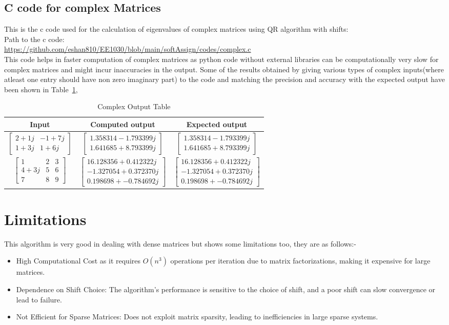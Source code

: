 \documentclass[12pt]{article}
\newcommand{\myvec}[1]{\begin{bmatrix} #1 \end{bmatrix}}
\begin{document}
\subsection{C code for complex Matrices}
This is the c code used for the calculation of eigenvalues of complex matrices using QR algorithm with shifts: \\
Path to the c code:\\
\url{https://github.com/eshan810/EE1030/blob/main/softAssign/codes/complex.c}\\
This code helps in faster computation of complex matrices as python code without external libraries can be computationally very slow for complex matrices and might incur inaccuracies in the output.
Some of the results obtained by giving various types of complex inputs(where atleast one entry should have non zero imaginary part) to the code and matching the precision and accuracy with the expected output have been shown in Table~\ref{Table 2},
\begin{table}[H]
\centering
\begin{tabular}{|c|c|c|}
\hline
\textbf{Input} & \textbf{Computed output} & \textbf{Expected output} \\
\hline
$\myvec{2 + 1j & -1 + 7j\\1 + 3j&1 + 6j}$ & $\myvec{1.358314 - 1.793399j\\ 1.641685 + 8.793399j}$ & $\myvec{1.358314 - 1.793399j\\ 1.641685 + 8.793399j}$ \\ \hline
$\myvec{1&2&3\\4 + 3j&5&6\\7&8&9}$ & $\myvec{16.128356 + 0.412322j\\ -1.327054 + 0.372370j\\ 0.198698 + -0.784692j}$ & $\myvec{16.128356 + 0.412322j\\ -1.327054 + 0.372370j\\ 0.198698 + -0.784692j}$ \\ \hline
\end{tabular}
\caption{Complex Output Table}
\label{Table 2}
\end{table}
\section{Limitations}
This algorithm is very good in dealing with dense  matrices but shows some limitations too, they are as follows:-
\begin{itemize}
    \item High Computational Cost as it requires $O(n^3)$ operations per iteration due to matrix factorizations, making it expensive for large matrices.
    \item Dependence on Shift Choice: The algorithm's performance is sensitive to the choice of shift, and a poor shift can slow convergence or lead to failure.
    \item Not Efficient for Sparse Matrices: Does not exploit matrix sparsity, leading to inefficiencies in large sparse systems.
\end{itemize}
\end{document}

